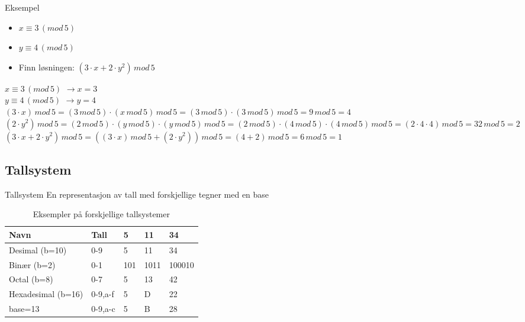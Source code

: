 \begin{frame}{}
\begin{exampleblock}{Eksempel}
\begin{itemize}
\item $x \equiv 3\,(mod\, 5)$
\item $y \equiv 4\,(mod\, 5)$
\item Finn løsningen: $(3\cdot x+2\cdot y^2)\, mod\,5$
\end{itemize}
\end{exampleblock}
\medskip

$x \equiv 3\,(mod\, 5)$ $\rightarrow x=3$\\
$y \equiv 4\,(mod\, 5)$ $\rightarrow y=4$\\
$(3\cdot x)\, mod\, 5 = (3\, mod\, 5)\cdot (x\, mod\, 5)\, mod\, 5=(3\, mod\, 5)\cdot (3\, mod\, 5)\, mod\, 5=9\, mod\, 5=4$\\
$(2\cdot y^2)\, mod\, 5 = (2\, mod\, 5)\cdot (y\, mod\, 5)\cdot (y\, mod\, 5)\, mod\, 5 = (2\, mod\, 5)\cdot (4\, mod\, 5)\cdot (4\, mod\, 5)\, mod\, 5=(2\cdot 4\cdot 4)\, mod\, 5=32\, mod\, 5=2$\\
$(3\cdot x+2\cdot y^2)\, mod\,5=((3\cdot x)\, mod\, 5+ (2\cdot y^2))\, mod\, 5=(4+2)\, mod\, 5=6\, mod\, 5=1$
\end{frame}

\subsection*{Tallsystem}
\begin{frame}
\begin{block}{Tallsystem}
En representasjon av tall med forskjellige tegner med en base
\end{block}
\medskip

\begin{table}[]
\centering
\label{tab:tallsystemer}
\begin{tabular}{l|l|l|l|l}
Navn & Tall & 5 & 11 & 34 \\ \hline
Desimal (b=10) & 0-9 & 5& 11 & 34 \\
Binær (b=2) & 0-1 & 101 & 1011 & 100010 \\
Octal (b=8) & 0-7 & 5&  13 & 42\\
Hexadesimal (b=16) & 0-9,a-f& 5& D& 22\\
base=13 & 0-9,a-c & 5& B& 28
\end{tabular}
\caption{Eksempler på forskjellige tallsystemer}
\end{table}
\end{frame}

